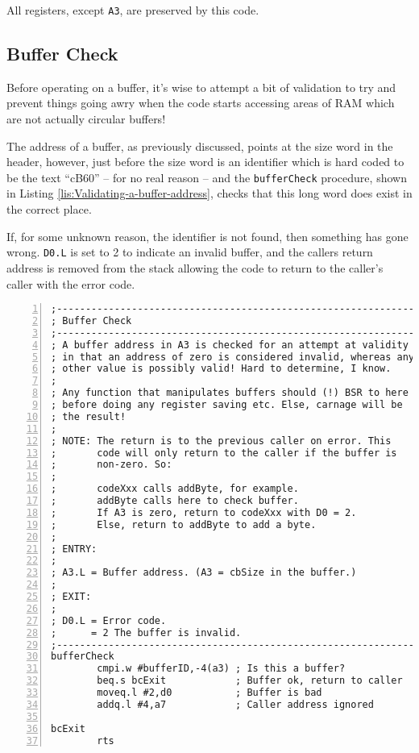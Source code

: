 All registers, except \texttt{A3}, are preserved by this code.

\subsection{Buffer Check}

Before operating on a buffer, it's wise to attempt a bit of validation
to try and prevent things going awry when the code starts accessing
areas of RAM which are not actually circular buffers!

The address of a buffer, as previously discussed, points at the size
word in the header, however, just before the size word is an identifier
which is hard coded to be the text ``cB60'' -- for no real reason
-- and the \texttt{bufferCheck} procedure, shown in Listing \ref{lis:Validating-a-buffer-address},
checks that this long word does exist in the correct place.

If, for some unknown reason, the identifier is not found, then something
has gone wrong. \texttt{D0.L} is set to 2 to indicate an invalid buffer,
and the callers return address is removed from the stack allowing
the code to return to the caller's caller with the error code.

\begin{lstlisting}[caption={Validating a buffer address},label={lis:Validating-a-buffer-address},numbers=left,showstringspaces=false,tabsize=4]
;--------------------------------------------------------------
; Buffer Check
;--------------------------------------------------------------
; A buffer address in A3 is checked for an attempt at validity
; in that an address of zero is considered invalid, whereas any
; other value is possibly valid! Hard to determine, I know.
;
; Any function that manipulates buffers should (!) BSR to here
; before doing any register saving etc. Else, carnage will be
; the result!
;
; NOTE: The return is to the previous caller on error. This
;       code will only return to the caller if the buffer is
;       non-zero. So:
;
;       codeXxx calls addByte, for example.
;       addByte calls here to check buffer.
;       If A3 is zero, return to codeXxx with D0 = 2.
;       Else, return to addByte to add a byte.
;
; ENTRY:
;
; A3.L = Buffer address. (A3 = cbSize in the buffer.)
;
; EXIT:
;
; D0.L = Error code.
;      = 2 The buffer is invalid.
;--------------------------------------------------------------
bufferCheck
        cmpi.w #bufferID,-4(a3) ; Is this a buffer?
        beq.s bcExit            ; Buffer ok, return to caller
        moveq.l #2,d0           ; Buffer is bad
        addq.l #4,a7            ; Caller address ignored

bcExit
        rts

\end{lstlisting}


